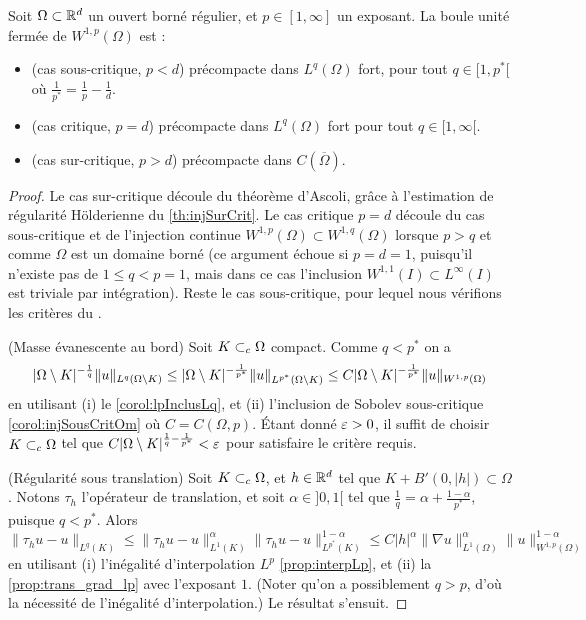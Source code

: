 \begin{theorem}[Rellich]
\label{th:Rellich}
% 
	Soit $\Omega\subset \mathbb{R}^d$ un ouvert borné régulier, et $p \in [1,\infty]$ un exposant. La boule unité fermée de $W^{1,p}(\Omega)$ est : 
	\begin{itemize}
		\item (cas sous-critique, $p<d$) précompacte dans $L^q(\Omega)$ fort, pour tout $q \in [1,p^*[$ où $\frac 1 {p^*} = \frac 1 p - \frac 1 d$.
		\item (cas critique, $p=d$) précompacte dans $L^q(\Omega)$ fort pour tout $q \in [1,\infty[$. 
		\item (cas sur-critique, $p>d$) précompacte dans $C(\overline \Omega)$. 
	\end{itemize}
\end{theorem}
\noindent
{}
\begin{proof}
	Le cas sur-critique découle du théorème d'Ascoli, grâce à l'estimation de régularité Hölderienne du \cref{th:injSurCrit}. Le cas critique $p=d$ découle du cas sous-critique et de l'injection continue $W^{1,p}(\Omega) \subset W^{1,q}(\Omega)$ lorsque $p>q$ et comme $\Omega$ est un domaine borné (ce argument échoue si $p=d=1$, puisqu'il n'existe pas de $1\leq q < p = 1$, mais dans ce cas l'inclusion $W^{1,1}(I)\subset L^\infty(I)$ est triviale par intégration).
	Reste le cas sous-critique, pour lequel nous vérifions les critères du .
	
	(Masse évanescente au bord) Soit $K \subset_c \Omega$ compact. Comme $q < p^*$ on a 
	\begin{equation*}
		|\Omega\setminus K|^{-\frac 1 q} \|u\|_{L^q(\Omega\setminus K)} 
		\leq |\Omega\setminus K|^{-\frac 1 {p^*}} \|u\|_{L^{p^*}(\Omega\setminus K)}
		\leq C |\Omega\setminus K|^{-\frac 1 {p^*}} \|u\|_{W^{1,p}(\Omega)}
	\end{equation*}
	en utilisant (i) le \cref{corol:lpInclusLq}, et (ii) l'inclusion de Sobolev sous-critique \cref{corol:injSousCritOm} où $C = C(\Omega,p)$.
	Étant donné $\varepsilon>0$, il suffit de choisir $K \subset_c \Omega$ tel que $C|\Omega\setminus K|^{\frac 1 q-\frac 1 {p^*}} < \varepsilon$ pour satisfaire le critère requis.
	
	(Régularité sous translation) Soit $K \subset_c \Omega$, et $h\in \mathbb{R}^d$ tel que $K + B'(0,|h|) \subset \Omega$. Notons $\tau_h$ l'opérateur de translation, et soit $\alpha \in ]0,1[$ tel que $\frac 1 q = \alpha + \frac{1-\alpha}{p^*}$, puisque $q<p^*$. Alors 
	\begin{equation*}
		\|\tau_h u-u\|_{L^q(K)} 
		\leq \|\tau_h u-u\|^\alpha_{L^1(K)} \|\tau_h u-u\|^{1-\alpha}_{L^{p^*}(K)} 
		\leq C |h|^\alpha \| \nabla u\|^\alpha_{L^1(\Omega)} \|u\|^{1-\alpha}_{W^{1,p}(\Omega)}
	\end{equation*}
	en utilisant (i) l'inégalité d'interpolation $L^p$ \cref{prop:interpLp}, et (ii) la \cref{prop:trans_grad_lp} avec l'exposant $1$. 
	(Noter qu'on a possiblement $q>p$, d'où la nécessité de l'inégalité d'interpolation.)
	Le résultat s'ensuit.
\end{proof}

